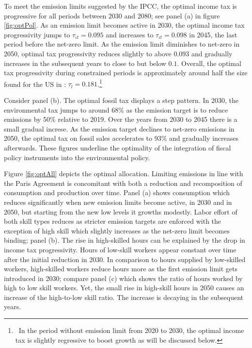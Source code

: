 To meet the emission limits suggested by the IPCC, the optimal income tax is progressive for all periods between 2030 and 2080; see panel (a) in figure \ref{fig:optPol}.  
As an emission limit becomes active in 2030, the optimal income tax progressivity jumps to $\tau_{\iota t}=0.095$ and increases to $\tau_{\iota t}=0.098$ in 2045, the last period before the net-zero limit. As the emission limit diminishes to net-zero in 2050, optimal tax progressivity reduces slightly to above $0.093$ and gradually increases in the subsequent years to close to but below $0.1$. Overall, the optimal tax progressivity during constrained periods is approximately  around half the size found for the US in \cite{Heathcote2017OptimalFramework}: $\tau_{l}=0.181$.\footnote{\ 
In the period without emission limit from 2020 to 2030, the optimal income tax is slightly regressive to boost growth as will be discussed below.}

%
Consider panel (b). The optimal fossil tax displays a step pattern. In 2030, the environmental tax jumps to around 68\% as the emission target is to reduce emissions by 50\% relative to 2019. Over the years from 2030 to 2045 there is a small gradual increse. As the emission target declines to net-zero emissions in 2050, the optimal tax on fossil sales accelerates to 93\% and gradually increases afterwards. 
These figures underline the optimality of the integration of fiscal policy instruments into the environmental policy.

Figure \ref{fig:optAll} depicts the optimal allocation. Limiting emissions in line with the Paris Agreement is concomitant with both a reduction and recomposition of consumption and production over time. 
Panel (a) shows consumption which reduces significantly when new emission limits become active, in 2030 and in 2050, but starting from the new low levels it growths modestly. Labor effort of both skill types reduces as stricter emission targets are enforced with the exception of high skill which slightly increases as the net-zero limit becomes binding; panel (b). The rise in high-skilled hours can be explained by the drop in income tax progressivity. Hours of low-skill workers appear constant over time after the initial reduction in 2030.  In comparison to hours supplied by low-skilled workers, high-skilled workers reduce hours more as the first emission limit gets introduced in 2030; compare panel (c) which shows the ratio of hours worked by high to low skill workers. Yet, the small rise in high-skill hours in 2050 causes an increase of the high-to-low skill ratio. The increase is decaying in the subsequent years.

